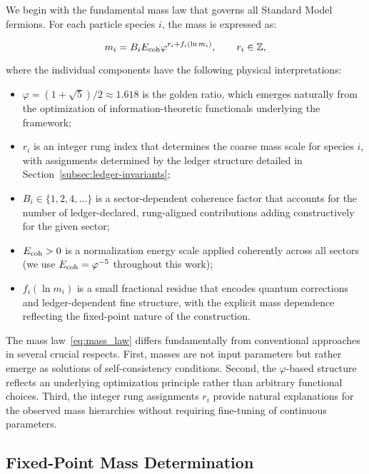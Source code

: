 \documentclass[%
amsmath,amssymb,
aps,
prb,
floatfix,
twocolumn
]{revtex4-2}
\begin{document}
We begin with the fundamental mass law that governs all Standard Model fermions. For each particle species $i$, the mass is expressed as:

\begin{equation}
m_i = B_i E_{\rm coh} \varphi^{r_i + f_i(\ln m_i)}, \qquad r_i \in \mathbb{Z},
\label{eq:mass_law}
\end{equation}

where the individual components have the following physical interpretations:

\begin{itemize}
\item $\varphi = (1+\sqrt{5})/2 \approx 1.618$ is the golden ratio, which emerges naturally from the optimization of information-theoretic functionals underlying the framework;

\item $r_i$ is an integer rung index that determines the coarse mass scale for species $i$, with assignments determined by the ledger structure detailed in Section~\ref{subsec:ledger-invariants};

\item $B_i \in \{1, 2, 4, \ldots\}$ is a sector-dependent coherence factor that accounts for the number of ledger-declared, rung-aligned contributions adding constructively for the given sector;

\item $E_{\rm coh} > 0$ is a normalization energy scale applied coherently across all sectors (we use $E_{\rm coh} = \varphi^{-5}$ throughout this work);

\item $f_i(\ln m_i)$ is a small fractional residue that encodes quantum corrections and ledger-dependent fine structure, with the explicit mass dependence reflecting the fixed-point nature of the construction.
\end{itemize}

The mass law~\eqref{eq:mass_law} differs fundamentally from conventional approaches in several crucial respects. First, masses are not input parameters but rather emerge as solutions of self-consistency conditions. Second, the $\varphi$-based structure reflects an underlying optimization principle rather than arbitrary functional choices. Third, the integer rung assignments $r_i$ provide natural explanations for the observed mass hierarchies without requiring fine-tuning of continuous parameters.

\subsection{Fixed-Point Mass Determination}
\label{subsec:fixed-point}
\end{document}
